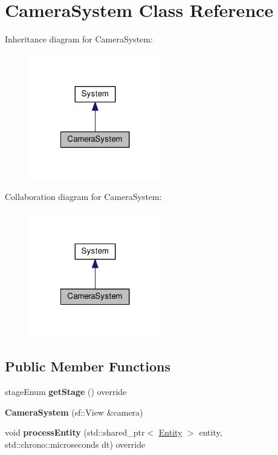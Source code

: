 \hypertarget{classCameraSystem}{\section{Camera\-System Class Reference}
\label{classCameraSystem}
}


Inheritance diagram for Camera\-System\-:
\nopagebreak
\begin{figure}[H]
\begin{center}
\leavevmode
\includegraphics[width=164pt]{classCameraSystem__inherit__graph}
\end{center}
\end{figure}


Collaboration diagram for Camera\-System\-:
\nopagebreak
\begin{figure}[H]
\begin{center}
\leavevmode
\includegraphics[width=164pt]{classCameraSystem__coll__graph}
\end{center}
\end{figure}
\subsection*{Public Member Functions}
\begin{DoxyCompactItemize}
\item 
\hypertarget{classCameraSystem_abe46203a557de5eed55f33ac642824b4}{stage\-Enum {\bfseries get\-Stage} () override}\label{classCameraSystem_abe46203a557de5eed55f33ac642824b4}

\item 
\hypertarget{classCameraSystem_a1bd7eb1c192581c62dfc64479d8a232d}{{\bfseries Camera\-System} (sf\-::\-View \&camera)}\label{classCameraSystem_a1bd7eb1c192581c62dfc64479d8a232d}

\item 
\hypertarget{classCameraSystem_a09a5562a60158442222ff523b5e91426}{void {\bfseries process\-Entity} (std\-::shared\-\_\-ptr$<$ \hyperlink{classEntity}{Entity} $>$ entity, std\-::chrono\-::microseconds dt) override}\label{classCameraSystem_a09a5562a60158442222ff523b5e91426}

\end{DoxyCompactItemize}
